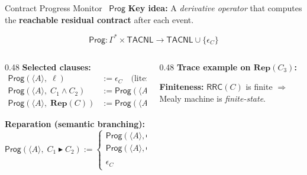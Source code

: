 \documentclass[9pt,aspectratio=169]{beamer}
\newcommand{\logic}[1]{\ensuremath{\mathsf{#1}}\xspace}
\newcommand{\cDL}{\logic{TACNL}}
\newcommand{\Prog}{\ensuremath{\mathsf{Prog}}\xspace}
\newcommand{\repair}{\ensuremath{\blacktriangleright}}
\newcommand{\obl}[2][]{\mathbf{O}_{#1}(#2)}
\newcommand{\repit}[1]{\mathbf{Rep}(#1)}
\newcommand{\trace}[1]{\ensuremath{\langle #1 \rangle}\xspace}
\newcommand{\emptc}{\ensuremath{\epsilon_{C}}}
\newcommand{\topt}{\top^t}
\newcommand{\bott}{\bot^t}
\newcommand{\satt}{\models_{\topt}}
\newcommand{\violt}{\models_{\bott}}
\newcommand{\presat}{\models_{?}}
\newcommand{\rrcs}[1]{\ensuremath{\mathsf{RRC}\!\left(#1\right)}\xspace}
\newcommand{\PAY}{\ensuremath{\mathsf{PAY\_R}}\xspace}
\newcommand{\PAYF}{\ensuremath{\mathsf{PAY\_F}}\xspace}
\newcommand{\OCC}{\ensuremath{\mathsf{OCC}}\xspace}
\begin{document}
\begin{frame}{Contract Progress Monitor \textemdash\ $\Prog$}
\small
\textbf{Key idea:} A \emph{derivative operator} that computes the \textbf{reachable residual contract} after each event.

\[
\Prog : \Gamma^* \times \cDL \to \cDL \cup \{\emptc\}
\]

\begin{columns}[T]
\begin{column}{0.48\textwidth}
  \textbf{Selected clauses:}
  \begin{align*}
    \Prog(\trace{A},\;\ell) &:= \emptc \quad\text{(literal consumed)}\\
    \Prog(\trace{A},\;C_1 \wedge C_2) &:= \Prog(\trace{A},C_1) \wedge \Prog(\trace{A},C_2)\\
    \Prog(\trace{A},\;\repit{C}) &:= \Prog(\trace{A},C)\;;\;\repit{C}
  \end{align*}

  \textbf{Reparation (semantic branching):}
  \[
  \Prog(\trace{A},\;C_1 \repair C_2) :=
    \begin{cases}
      \Prog(\trace{A},C_1) \repair C_2 & \text{if } \trace{A} \presat C_1\\
      \Prog(\trace{A},C_2) & \text{if } \trace{A} \violt C_1\\
      \emptc & \text{if } \trace{A} \satt C_1
    \end{cases}
  \]
\end{column}
\begin{column}{0.48\textwidth}
  \textbf{Trace example on $\repit{C_3}$:}
  \begin{center}
  \end{center}

  \vspace{2mm}
  \textbf{Finiteness:} $\rrcs{C}$ is finite $\Rightarrow$ Mealy machine is \emph{finite-state}.
\end{column}
\end{columns}
\end{frame}
\end{document}
